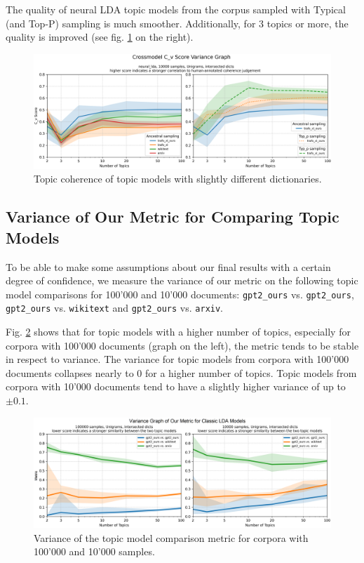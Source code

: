 The quality of neural LDA topic models from the corpus sampled with Typical (and Top-P) sampling is much smoother. Additionally, for 3 topics or more, the quality is improved (see fig. \ref{fig:Unigrams-10000-crossmodel-cv-var-neural_lda-trafo_xl+nt-is} on the right).
\begin{figure}[H]
    \centering
    \includegraphics[width=1\textwidth]{figures/Unigrams-10000-crossmodel-cv-var-neural_lda-trafo_xl+nt-is}
    \caption{Topic coherence of topic models with slightly different dictionaries.}
    \label{fig:Unigrams-10000-crossmodel-cv-var-neural_lda-trafo_xl+nt-is}
\end{figure}


\subsection{Variance of Our Metric for Comparing Topic Models}
To be able to make some assumptions about our final results with a certain degree of confidence, we measure the variance of our metric on the following topic model comparisons for 100'000 and 10'000 documents: \texttt{gpt2\_ours} vs. \texttt{gpt2\_ours}, \texttt{gpt2\_ours} vs. \texttt{wikitext} and \texttt{gpt2\_ours} vs. \texttt{arxiv}.

Fig. \ref{fig:Unigrams-var-tt-is} shows that for topic models with a higher number of topics, especially for corpora with 100'000 documents (graph on the left), the metric tends to be stable in respect to variance. The variance for topic models from corpora with 100'000 documents collapses nearly to 0 for a higher number of topics. Topic models from corpora with 10'000 documents tend to have a slightly higher variance of up to $\pm0.1$.  
\begin{figure}[H]
    \centering
    \includegraphics[width=1\textwidth]{figures/Unigrams-var-tt-is}
    \caption{Variance of the topic model comparison metric for corpora with 100'000 and 10'000 samples.}
    \label{fig:Unigrams-var-tt-is}
\end{figure}

